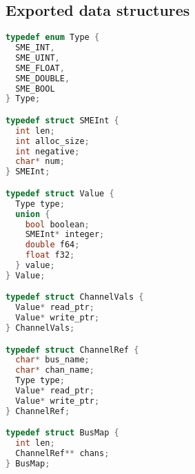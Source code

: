\subsection{Exported data structures}
\begin{lstlisting}[language=c,multicols=2]
typedef enum Type {
  SME_INT,
  SME_UINT,
  SME_FLOAT,
  SME_DOUBLE,
  SME_BOOL
} Type;

typedef struct SMEInt {
  int len;
  int alloc_size;
  int negative;
  char* num;
} SMEInt;

typedef struct Value {
  Type type;
  union {
    bool boolean;
    SMEInt* integer;
    double f64;
    float f32;
  } value;
} Value;

typedef struct ChannelVals {
  Value* read_ptr;
  Value* write_ptr;
} ChannelVals;

typedef struct ChannelRef {
  char* bus_name;
  char* chan_name;
  Type type;
  Value* read_ptr;
  Value* write_ptr;
} ChannelRef;

typedef struct BusMap {
  int len;
  ChannelRef** chans;
} BusMap;
\end{lstlisting}

